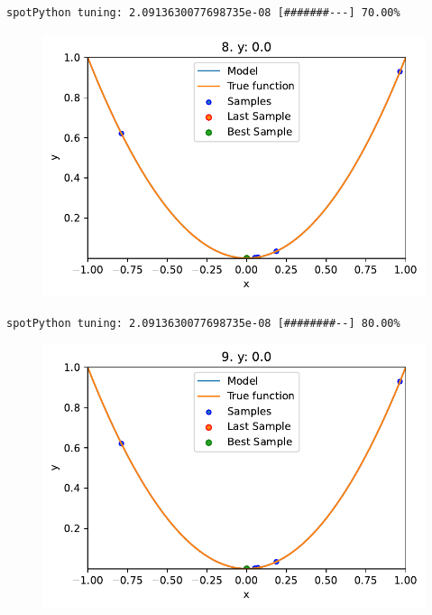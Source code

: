 \documentclass[
  letterpaper,
  DIV=11,
  numbers=noendperiod]{scrreprt}
\begin{document}
\begin{verbatim}
spotPython tuning: 2.0913630077698735e-08 [#######---] 70.00% 
\end{verbatim}

\begin{figure}[H]

{\centering \includegraphics{010_num_spot_sklearn_surrogate_files/figure-pdf/cell-25-output-10.pdf}

}

\end{figure}

\begin{verbatim}
spotPython tuning: 2.0913630077698735e-08 [########--] 80.00% 
\end{verbatim}

\begin{figure}[H]

{\centering \includegraphics{010_num_spot_sklearn_surrogate_files/figure-pdf/cell-25-output-12.pdf}

}

\end{figure}
\end{document}
